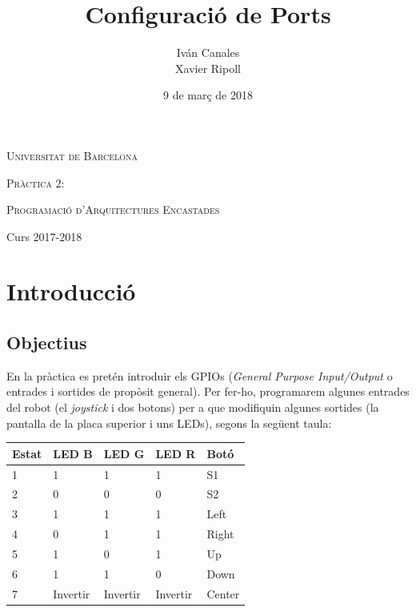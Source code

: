 \documentclass[12pt,a4paper]{article}
\title{Configuració de Ports}
\author{
    Iván Canales%
    \\
    Xavier Ripoll%
}
\date{9 de març de 2018}
\begin{document}

\begin{titlepage}
	\centering
	{\scshape\LARGE Universitat de Barcelona \par}
	\vspace{2cm}
	{\scshape\Large Pràctica 2:\par}
	\vspace{1cm}
	{\huge\bfseries \thetitle \par}

    \vfill
    \large\theauthor
	\vfill
	\raggedleft

    \par

    {\scshape Programació d'Arquitectures Encastades\par}
    \texttt{}{Curs 2017-2018\par} %
    \thedate


\end{titlepage} \pagebreak
\section{Introducció}

\subsection{Objectius}

En la pràctica es pretén introduir els GPIOs (\textit{General Purpose
Input/Output} o entrades i sortides de propòsit general). Per fer-ho,
programarem algunes entrades del robot (el \textit{joystick} i dos botons) per
a que modifiquin algunes sortides (la pantalla de la placa superior i uns LEDs),
segons la següent taula:

\begin{table}[H]
  \centering
  \begin{tabular}{|l||l|l|l||l|} \hline
    Estat & LED B    & LED G    & LED R    & Botó   \\ \hline
    1     & 1        & 1        & 1        & S1     \\ \hline
    2     & 0        & 0        & 0        & S2     \\ \hline
    3     & 1        & 1        & 1        & Left   \\ \hline
    4     & 0        & 1        & 1        & Right  \\ \hline
    5     & 1        & 0        & 1        & Up     \\ \hline
    6     & 1        & 1        & 0        & Down   \\ \hline
    7     & Invertir & Invertir & Invertir & Center \\ \hline
  \end{tabular}
\end{table}
\end{document}
